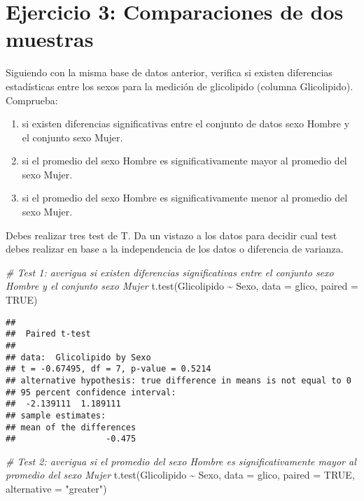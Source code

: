 \documentclass[
]{article}
\newenvironment{Shaded}{}{}
\newcommand{\AttributeTok}[1]{\textcolor[rgb]{0.49,0.56,0.16}{#1}}
\newcommand{\CommentTok}[1]{\textcolor[rgb]{0.38,0.63,0.69}{\textit{#1}}}
\newcommand{\ConstantTok}[1]{\textcolor[rgb]{0.53,0.00,0.00}{#1}}
\newcommand{\FunctionTok}[1]{\textcolor[rgb]{0.02,0.16,0.49}{#1}}
\newcommand{\NormalTok}[1]{#1}
\newcommand{\SpecialCharTok}[1]{\textcolor[rgb]{0.25,0.44,0.63}{#1}}
\newcommand{\StringTok}[1]{\textcolor[rgb]{0.25,0.44,0.63}{#1}}
\begin{document}
\hypertarget{ejercicio-3-comparaciones-de-dos-muestras}{%
\section{\texorpdfstring{\textbf{Ejercicio 3: Comparaciones de dos
muestras}}{Ejercicio 3: Comparaciones de dos muestras}}\label{ejercicio-3-comparaciones-de-dos-muestras}}

Siguiendo con la misma base de datos anterior, verifica si existen
diferencias estadísticas entre los sexos para la medición de glicolipido
(columna Glicolipido). Comprueba:

\begin{enumerate}
\def\labelenumi{\arabic{enumi}.}
\item
  si existen diferencias significativas entre el conjunto de datos sexo
  Hombre y el conjunto sexo Mujer.
\item
  si el promedio del sexo Hombre es significativamente mayor al promedio
  del sexo Mujer.
\item
  si el promedio del sexo Hombre es significativamente menor al promedio
  del sexo Mujer.
\end{enumerate}

Debes realizar tres test de T. Da un vistazo a los datos para decidir
cual test debes realizar en base a la independencia de los datos o
diferencia de varianza.

\begin{Shaded}
\begin{Highlighting}[]
\CommentTok{\# Test 1: averigua si existen diferencias significativas entre el conjunto sexo Hombre y el conjunto sexo Mujer}
\FunctionTok{t.test}\NormalTok{(Glicolipido }\SpecialCharTok{\textasciitilde{}}\NormalTok{ Sexo, }\AttributeTok{data =}\NormalTok{ glico, }\AttributeTok{paired =} \ConstantTok{TRUE}\NormalTok{)}
\end{Highlighting}
\end{Shaded}

\begin{verbatim}
## 
##  Paired t-test
## 
## data:  Glicolipido by Sexo
## t = -0.67495, df = 7, p-value = 0.5214
## alternative hypothesis: true difference in means is not equal to 0
## 95 percent confidence interval:
##  -2.139111  1.189111
## sample estimates:
## mean of the differences 
##                  -0.475
\end{verbatim}

\begin{Shaded}
\begin{Highlighting}[]
\CommentTok{\# Test 2: averigua si el promedio del sexo Hombre es significativamente mayor al promedio del sexo Mujer}
\FunctionTok{t.test}\NormalTok{(Glicolipido }\SpecialCharTok{\textasciitilde{}}\NormalTok{ Sexo, }\AttributeTok{data =}\NormalTok{ glico, }
       \AttributeTok{paired =} \ConstantTok{TRUE}\NormalTok{, }\AttributeTok{alternative =} \StringTok{"greater"}\NormalTok{)}
\end{Highlighting}
\end{Shaded}
\end{document}
